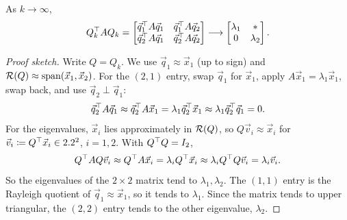 \begin{proposition}
  \label{prop:orth-iter-2x2}
  As $k \to \infty$,
  \begin{equation}
    Q_k^\top AQ_k = \begin{bmatrix} \vec{q}_1^\top A\vec{q}_1 & \vec{q}_1^\top A\vec{q}_2 \\ \vec{q}_2^\top A\vec{q}_1 & \vec{q}_2^\top A\vec{q}_2 \end{bmatrix} \longrightarrow \begin{bmatrix} \lambda_1 & \ast \\ 0 & \lambda_2 \end{bmatrix}.
  \end{equation}
\end{proposition}

\begin{center}
\end{center}

\begin{proof}[Proof sketch]
  Write $Q = Q_k$. We use $\vec{q}_1 \approx \vec{x}_1$ (up to sign) and $\mathcal{R}(Q) \approx \operatorname{span}(\vec{x}_1, \vec{x}_2)$. For the $(2,1)$ entry, swap $\vec{q}_1$ for $\vec{x}_1$, apply $A\vec{x}_1 = \lambda_1\vec{x}_1$, swap back, and use $\vec{q}_2 \perp \vec{q}_1$:
  \begin{equation}
    \vec{q}_2^\top A\vec{q}_1 \approx \vec{q}_2^\top A\vec{x}_1 = \lambda_1\vec{q}_2^\top\vec{x}_1 \approx \lambda_1\vec{q}_2^\top\vec{q}_1 = 0.
  \end{equation}
  For the eigenvalues, $\vec{x}_i$ lies approximately in $\mathcal{R}(Q)$, so $Q\vec{v}_i \approx \vec{x}_i$ for $\vec{v}_i \coloneqq Q^\top\vec{x}_i \in 2.2^2$, $i = 1, 2$. With $Q^\top Q = I_2$,
  \begin{equation}
    Q^\top AQ\vec{v}_i \approx Q^\top A\vec{x}_i = \lambda_iQ^\top\vec{x}_i \approx \lambda_iQ^\top Q\vec{v}_i = \lambda_i\vec{v}_i.
    \label{eq:orth-iter-ritz}
  \end{equation}
  So the eigenvalues of the $2 \times 2$ matrix tend to $\lambda_1, \lambda_2$. The $(1,1)$ entry is the Rayleigh quotient of $\vec{q}_1 \approx \vec{x}_1$, so it tends to $\lambda_1$. Since the matrix tends to upper triangular, the $(2,2)$ entry tends to the other eigenvalue, $\lambda_2$.
\end{proof}

